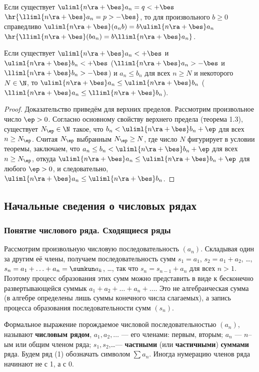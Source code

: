 \documentclass[a4paper]{article}
\newenvironment{imp*}{\par\vskip\theoremskip\textbf{Следствие.}\normalfont \itshape}{\par\vskip\theoremskip}
\begin{document}
\begin{imp*}
Если существует $\uliml{n\ra+\bes}a_n=q<+\bes$
$\hr{\lliml{n\ra+\bes}a_n=p>-\bes}$, то для произвольного $b\ge0$
справедливо $\uliml{n\ra+\bes} (a_n b)=b \uliml{n\ra+\bes}a_n$
$\hr{\lliml{n\ra+\bes}(ba_n)=b \lliml{n\ra+\bes}a_n}$.
\end{imp*}

\begin{theorem}
Если существует $\uliml{n\ra+\bes}a_n<+\bes$ и
$\uliml{n\ra+\bes}b_n<+\bes$ ($\lliml{n\ra+\bes}a_n>-\bes$ и
$\lliml{n\ra+\bes}b_n>-\bes$) и $a_n \le b_n$ для всех $n\ge N$ и
некоторого $N\in\N$, то $\uliml{n\ra+\bes}a_n \le
\uliml{n\ra+\bes}b_n$ ($\lliml{n\ra+\bes}a_n \le
\lliml{n\ra+\bes}b_n$).
\end{theorem}

\begin{proof}
Доказательство приведём для верхних пределов. Рассмотрим
произвольное число $\ep>0$. Согласно основному свойству верхнего
предела (теорема 1.3), существует $N_{\ep} \in \N$ такое, что $b_n <
\uliml{n\ra+\bes}b_n + \ep$ для всех $n\ge N_{\ep}$. Считая
$N_{\ep}$ выбранным $N_{\ep} \ge N$, где число $N$ фигурирует в
условии теоремы, заключаем, что $a_n \le b_n < \uliml{n\ra+\bes} b_n
+ \ep$ для всех $n\ge N_{\ep}$, откуда $\uliml{n\ra+\bes}a_n \le
\uliml{n\ra+\bes}b_n + \ep$ для любого $\ep>0$, и следовательно,
$\uliml{n\ra+\bes}a_n \le \uliml{n\ra+\bes}b_n$.
\end{proof}

\subsection{Начальные сведения о числовых рядах}
\subsubsection{Понятие числового ряда. Сходящиеся ряды}

Рассмотрим произвольную числовую последовательность $(a_n)$.
Складывая один за другим её члены, получаем последовательность сумм
$s_1=a_1$, $s_2=a_1+a_2$, \ldots, $s_n=a_1+\ldots+a_n=\sumkun a_k$,
\ldots, так что $s_n=s_{n-1}+a_n$ для всех $n>1$. Поэтому процесс
образования этих сумм можно представить в виде к бесконечно
развертывающейся суммык $a_1+a_2+\ldots+a_n+\ldots$. Это не
алгебраическая сумма (в алгебре определены лишь суммы конечного
числа слагаемых), а запись процесса образования последовательности
сумм $(s_n)$.

Формальное выражение  порождаемое
числовой последовательностью $(a_n)$, называют \textbf{числовым
рядом}, $a_1,a_2,\ldots$ --- его членами: первым, вторым; $a_n$ ---
$n$--ым или общим членом ряда; $s_1,s_2$,\ldots ---
\textbf{частными} (или \textbf{частичными}) \textbf{суммами} ряда.
Будем ряд (1) обозначать символом $\sum a_n$. Иногда нумерацию
членов ряда начинают не с 1, а с 0.
\end{document}
